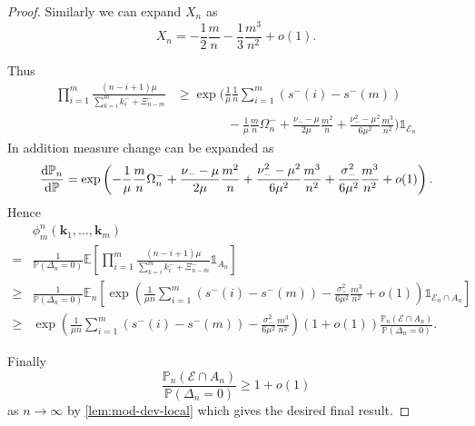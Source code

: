 \documentclass[draft]{scrartcl}
\newcommand{\E}{\mathbb E}
\newcommand{\littleo}{o}
\newcommand{\conmc}{\phi}
\newcommand{\indi}{\mathds{1}}
\newcommand{\vect}{\mathbf}
\renewcommand{\Pr}{\mathbb P}
\newcommand{\biasvar}{\sigma_-^2}
\newcommand{\omegaevent}{\mathcal E}
\begin{document}
\begin{proof}
    Similarly we can expand $X_n$ as
    \begin{equation}
        X_n = - \frac{1}{2} \frac{m}{n} - \frac{1}{3} \frac{m^3}{n^2} + \littleo(1).
    \end{equation}

    Thus
    \begin{align}
        \prod_{i=1}^m \frac{(n-i+1)\mu}{\sum_{k=i}^m k^-_i + \Xi^-_{n-m}}
        &\geq \exp \Bigg( \frac{1}{\mu} \frac{1}{n} \sum_{i=1}^m (s^-(i) - s^-(m)) \nonumber \\
        &\hspace{4em} - \frac{1}{\mu} \frac{m}{n} \Omega^-_n + \frac{\nu_- - \mu}{2 \mu} \frac{m^2}{n} + \frac{\nu_-^2 - \mu^2}{6 \mu^2} \frac{m^3}{n^2} \Bigg) \indi_{\omegaevent_n}
    \end{align}
    In addition measure change can be expanded as
    \begin{equation}
        \diff{\Pr_n}{\Pr} = \exp \left( 
            - \frac{1}{\mu} \frac{m}{n} \Omega_n^- + \frac{\nu_- - \mu}{2\mu} \frac{m^2}{n}
            + \frac{\nu_-^2 - \mu^2}{6 \mu^2} \frac{m^3}{n^2} + \frac{\biasvar}{6 \mu^2} \frac{m^3}{n^2} + \littleo(1)
         \right).
    \end{equation}
    Hence
    \begin{align}
        &\conmc^n_m(\vect{k}_1, \ldots, \vect{k}_m) \\
        =& \frac{1}{\Pr(\Delta_n = 0)} \E \left[\prod_{i=1}^m \frac{(n-i+1)\mu}{\sum_{k=i}^m k^-_i + \Xi^-_{n-m}} \indi_{A_n} \right] \\
        \geq& \frac{1}{\Pr(\Delta_n = 0)} \E_n \left[ \exp \left(
                \frac{1}{\mu n} \sum_{i=1}^m \left( s^-(i) - s^-(m) \right)
                - \frac{\biasvar}{6 \mu^2} \frac{m^3}{n^2} + \littleo(1)
            \right) \indi_{\omegaevent_n \cap A_n} \right] \\
        \geq& \exp \left(
                \frac{1}{\mu n} \sum_{i=1}^m \left( s^-(i) - s^-(m) \right)
                - \frac{\biasvar}{6 \mu^2} \frac{m^3}{n^2}
            \right) (1 + \littleo(1)) \frac{\Pr_n(\omegaevent\cap A_n)}{\Pr(\Delta_n = 0)}.
    \end{align}

    Finally
    \begin{equation}
        \frac{\Pr_n(\omegaevent\cap A_n)}{\Pr(\Delta_n = 0)} \geq 1 + \littleo(1)
    \end{equation}
    as $n \to \infty$ by \cref{lem:mod-dev-local} which gives the desired final result.
\end{proof}

\printbibliography
\end{document}
